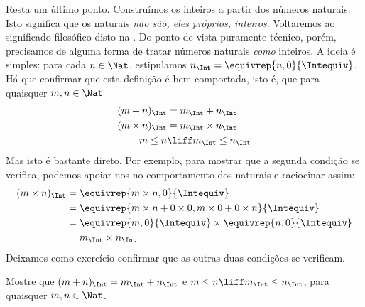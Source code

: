 \documentclass[../../../include/open-logic-section]{subfiles}
\begin{document}
Resta um último ponto. Construímos os inteiros a partir dos números naturais. Isto significa que os naturais \emph{não são, eles próprios, inteiros}. Voltaremos ao significado filosófico disto na . Do ponto de vista puramente técnico, porém, precisamos de alguma forma de tratar números naturais \emph{como} inteiros. A ideia é simples: para cada $n \in \Nat$, estipulamos $n_\Int = \equivrep{n, 0}{\Intequiv}$. Há que confirmar que esta definição é bem comportada, isto é, que para quaisquer $m, n
\in \Nat$
\begin{align*}
	(m + n)_\Int &= m_\Int + n_\Int\\
	(m \times n)_\Int &= m_\Int \times n_\Int\\
	m \leq n &\liff m_\Int \leq n_\Int
\end{align*}
Mas isto é bastante direto. Por exemplo, para mostrar que a segunda condição se verifica, podemos apoiar-nos no comportamento dos naturais e raciocinar assim:
	\begin{align*}
		(m \times n)_\Int  &= \equivrep{m \times n, 0}{\Intequiv} \\
		&= \equivrep{m \times n + 0 \times 0, m \times 0 + 0 \times n}{\Intequiv} \\
		&= \equivrep{m, 0}{\Intequiv} \times \equivrep{n, 0}{\Intequiv} \\
		&= m_\Int \times n_\Int
	\end{align*}
Deixamos como exercício confirmar que as outras duas condições se verificam.
\begin{prob}
	Mostre que $(m + n)_\Int = m_\Int + n_\Int$ e $m \leq n \liff m_\Int \leq n_\Int$, para quaisquer $m, n \in \Nat$.
\end{prob}
\end{document}
